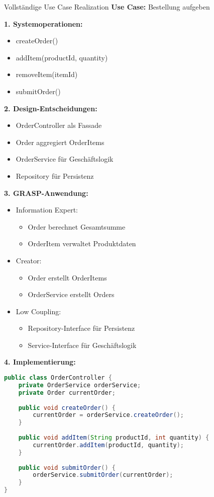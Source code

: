 \begin{example}{Vollständige Use Case Realization}
\textbf{Use Case:} Bestellung aufgeben

\textbf{1. Systemoperationen:}
\begin{itemize}
    \item createOrder()
    \item addItem(productId, quantity)
    \item removeItem(itemId)
    \item submitOrder()
\end{itemize}

\textbf{2. Design-Entscheidungen:}
\begin{itemize}
    \item OrderController als Fassade
    \item Order aggregiert OrderItems
    \item OrderService für Geschäftslogik
    \item Repository für Persistenz
\end{itemize}

\textbf{3. GRASP-Anwendung:}
\begin{itemize}
    \item Information Expert:
    \begin{itemize}
        \item Order berechnet Gesamtsumme
        \item OrderItem verwaltet Produktdaten
    \end{itemize}
    \item Creator:
    \begin{itemize}
        \item Order erstellt OrderItems
        \item OrderService erstellt Orders
    \end{itemize}
    \item Low Coupling:
    \begin{itemize}
        \item Repository-Interface für Persistenz
        \item Service-Interface für Geschäftslogik
    \end{itemize}
\end{itemize}

\textbf{4. Implementierung:}
\begin{lstlisting}[language=Java, style=basesmol]
public class OrderController {
    private OrderService orderService;
    private Order currentOrder;
    
    public void createOrder() {
        currentOrder = orderService.createOrder();
    }
    
    public void addItem(String productId, int quantity) {
        currentOrder.addItem(productId, quantity);
    }
    
    public void submitOrder() {
        orderService.submitOrder(currentOrder);
    }
}
\end{lstlisting}
\end{example}

